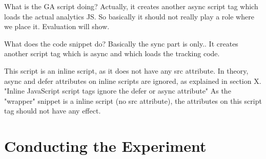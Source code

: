 





What is the GA script doing?
Actually, it creates another async script tag which loads the actual analytics JS.
So basically it should not really play a role where we place it.
Evaluation will show.

What does the code snippet do?
Basically the sync part is only..
It creates another script tag which is async and which loads the tracking code.

This script is an inline script, as it does not have any src attribute.
In theory,  async and defer attributes on inline scripts are ignored, as explained in section X.
"Inline JavaScript script tags ignore the defer or async attribute"
As the "wrapper" snippet is a inline script (no src attribute), the attributes on this script tag should not have any effect.










\section{Conducting the Experiment}




